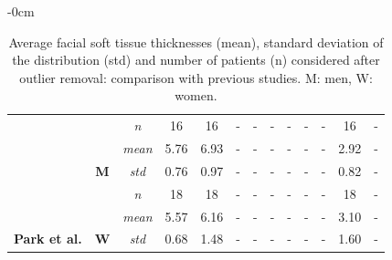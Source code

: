 \documentclass[journal,article,submit,pdftex,moreauthors]{Definitions/mdpi}
\begin{document}
\begin{table}[H]
\begin{adjustwidth}{-\extralength}{0cm}
{\begin{tabular}{ccccccccccccc}
 &  & {\color[HTML]{3531FF} \textit{n}} & {\color[HTML]{3531FF} 16} & {\color[HTML]{3531FF} 16} & {\color[HTML]{3531FF} -} & {\color[HTML]{3531FF} -} & {\color[HTML]{3531FF} -} & {\color[HTML]{3531FF} -} & {\color[HTML]{3531FF} -} & {\color[HTML]{3531FF} -} & {\color[HTML]{3531FF} 16} & {\color[HTML]{3531FF} -} \\ \cline{3-13} 
 &  & {\color[HTML]{3531FF} \textit{mean}} & {\color[HTML]{3531FF} 5.76} & {\color[HTML]{3531FF} 6.93} & {\color[HTML]{3531FF} -} & {\color[HTML]{3531FF} -} & {\color[HTML]{3531FF} -} & {\color[HTML]{3531FF} -} & {\color[HTML]{3531FF} -} & {\color[HTML]{3531FF} -} & {\color[HTML]{3531FF} 2.92} & {\color[HTML]{3531FF} -} \\ \cline{3-13} 
 & \multirow{-3}{*}{{\color[HTML]{3531FF} \textbf{M}}} & {\color[HTML]{3531FF} \textit{std}} & {\color[HTML]{3531FF} 0.76} & {\color[HTML]{3531FF} 0.97} & {\color[HTML]{3531FF} -} & {\color[HTML]{3531FF} -} & {\color[HTML]{3531FF} -} & {\color[HTML]{3531FF} -} & {\color[HTML]{3531FF} -} & {\color[HTML]{3531FF} -} & {\color[HTML]{3531FF} 0.82} & {\color[HTML]{3531FF} -} \\ \cline{2-13} 
 &  & {\color[HTML]{FE0000} \textit{n}} & {\color[HTML]{FE0000} 18} & {\color[HTML]{FE0000} 18} & {\color[HTML]{FE0000} -} & {\color[HTML]{FE0000} -} & {\color[HTML]{FE0000} -} & {\color[HTML]{FE0000} -} & {\color[HTML]{FE0000} -} & {\color[HTML]{FE0000} -} & {\color[HTML]{FE0000} 18} & {\color[HTML]{FE0000} -} \\ \cline{3-13} 
 &  & {\color[HTML]{FE0000} \textit{mean}} & {\color[HTML]{FE0000} 5.57} & {\color[HTML]{FE0000} 6.16} & {\color[HTML]{FE0000} -} & {\color[HTML]{FE0000} -} & {\color[HTML]{FE0000} -} & {\color[HTML]{FE0000} -} & {\color[HTML]{FE0000} -} & {\color[HTML]{FE0000} -} & {\color[HTML]{FE0000} 3.10} & {\color[HTML]{FE0000} -} \\ \cline{3-13} 
\multirow{-6}{*}{\textbf{Park et al.}} & \multirow{-3}{*}{{\color[HTML]{FE0000} \textbf{W}}} & {\color[HTML]{FE0000} \textit{std}} & {\color[HTML]{FE0000} 0.68} & {\color[HTML]{FE0000} 1.48} & {\color[HTML]{FE0000} -} & {\color[HTML]{FE0000} -} & {\color[HTML]{FE0000} -} & {\color[HTML]{FE0000} -} & {\color[HTML]{FE0000} -} & {\color[HTML]{FE0000} -} & {\color[HTML]{FE0000} 1.60} & {\color[HTML]{FE0000} -} \\ \hline
\end{tabular}
}
\caption{Average facial soft tissue thicknesses (mean), standard deviation of the distribution (std) and number of patients (n) considered after outlier removal: comparison with previous studies. M: men, W: women. \label{tab4}}
\end{adjustwidth}
\end{table}
\vspace{-0.6cm}
\end{document}
